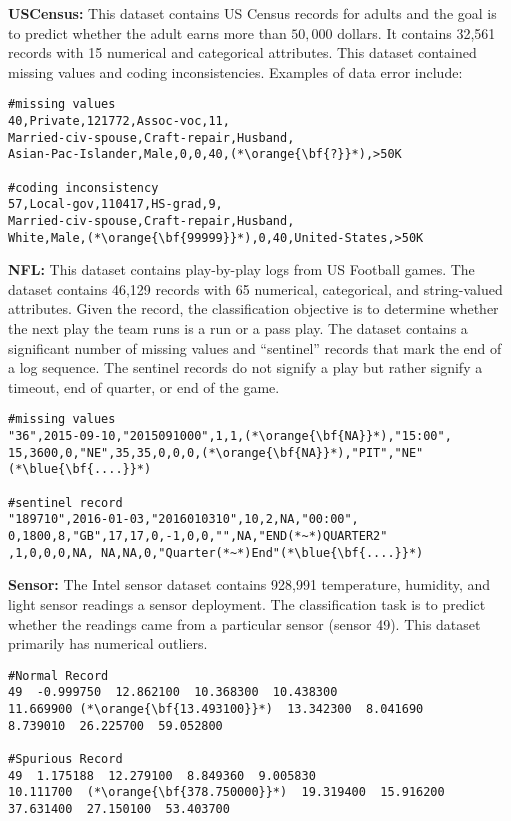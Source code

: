 
\vspace{0.5em}\noindent\textbf{USCensus: } This dataset contains US Census records for adults and the goal is to predict  whether the adult earns more than $50,000$ dollars. It contains 32,561 records with 15 numerical and categorical attributes. This dataset contained missing values and coding inconsistencies.
Examples of data error include:
\begin{lstlisting}
#missing values
40,Private,121772,Assoc-voc,11,
Married-civ-spouse,Craft-repair,Husband, 
Asian-Pac-Islander,Male,0,0,40,(*\orange{\bf{?}}*),>50K

#coding inconsistency
57,Local-gov,110417,HS-grad,9,
Married-civ-spouse,Craft-repair,Husband,
White,Male,(*\orange{\bf{99999}}*),0,40,United-States,>50K
\end{lstlisting}


\vspace{0.5em}\noindent\textbf{NFL: } This dataset contains play-by-play logs from US Football games. The dataset contains 46,129 records with 65 numerical, categorical, and string-valued attributes. Given the record, the classification objective is to determine whether the next play the team runs is a run or a pass play.
The dataset contains a significant number of missing values and ``sentinel'' records that mark the end of a log sequence. The sentinel records do not signify a play but rather signify a timeout, end of quarter, or end of the game.
\begin{lstlisting}
#missing values
"36",2015-09-10,"2015091000",1,1,(*\orange{\bf{NA}}*),"15:00",
15,3600,0,"NE",35,35,0,0,0,(*\orange{\bf{NA}}*),"PIT","NE"(*\blue{\bf{....}}*)

#sentinel record
"189710",2016-01-03,"2016010310",10,2,NA,"00:00",
0,1800,8,"GB",17,17,0,-1,0,0,"",NA,"END(*~*)QUARTER2"
,1,0,0,0,NA, NA,NA,0,"Quarter(*~*)End"(*\blue{\bf{....}}*)
\end{lstlisting}




\vspace{0.5em}\noindent\textbf{Sensor: } The Intel sensor dataset contains 928,991 temperature, humidity, and light sensor readings a sensor deployment. The classification task is to predict whether the readings came from a particular sensor (sensor 49). This dataset primarily has numerical outliers.
\begin{lstlisting}
#Normal Record
49  -0.999750  12.862100  10.368300  10.438300  
11.669900 (*\orange{\bf{13.493100}}*)  13.342300  8.041690  
8.739010  26.225700  59.052800

#Spurious Record
49  1.175188  12.279100  8.849360  9.005830  
10.111700  (*\orange{\bf{378.750000}}*)  19.319400  15.916200  
37.631400  27.150100  53.403700
\end{lstlisting}

